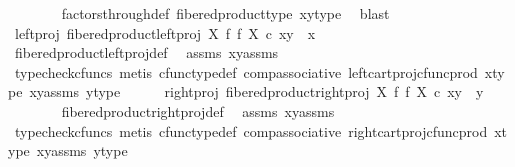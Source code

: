 \begin{isabellebody}
\ \ \ \ \ \ \isamarkupfalse%
\ factors{\isacharunderscore}{\kern0pt}through{\isacharunderscore}{\kern0pt}def{}\ fibered{\isacharunderscore}{\kern0pt}product{\isacharunderscore}{\kern0pt}type\ x{\isacharunderscore}{\kern0pt}y{\isacharunderscore}{\kern0pt}type\ \isamarkupfalse%
\ blast\isanewline
\isanewline
\ \ \ \ \isamarkupfalse%
\ left{\isacharunderscore}{\kern0pt}proj{\isacharcolon}{\kern0pt}\ {\isachardoublequoteopen}fibered{\isacharunderscore}{\kern0pt}product{\isacharunderscore}{\kern0pt}left{\isacharunderscore}{\kern0pt}proj\ X\ f\ f\ X\ {\isasymcirc}\isactrlsub c\ xy\ {\isacharequal}{\kern0pt}\ x{\isachardoublequoteclose}\isanewline
\ \ \ \ \ \ \isamarkupfalse%
\ fibered{\isacharunderscore}{\kern0pt}product{\isacharunderscore}{\kern0pt}left{\isacharunderscore}{\kern0pt}proj{\isacharunderscore}{\kern0pt}def\ \isamarkupfalse%
\ assms\ xy{\isacharunderscore}{\kern0pt}assms\isanewline
\ \ \ \ \ \ \isamarkupfalse%
\ {\isacharparenleft}{\kern0pt}typecheck{\isacharunderscore}{\kern0pt}cfuncs{\isacharcomma}{\kern0pt}\ metis\ cfunc{\isacharunderscore}{\kern0pt}type{\isacharunderscore}{\kern0pt}def\ comp{\isacharunderscore}{\kern0pt}associative\ left{\isacharunderscore}{\kern0pt}cart{\isacharunderscore}{\kern0pt}proj{\isacharunderscore}{\kern0pt}cfunc{\isacharunderscore}{\kern0pt}prod\ x{\isacharunderscore}{\kern0pt}type{}\ xy{\isacharunderscore}{\kern0pt}assms{\isacharparenleft}{\kern0pt}{}{\isacharparenright}{\kern0pt}\ y{\isacharunderscore}{\kern0pt}type{}{\isacharparenright}{\kern0pt}\isanewline
\ \ \ \ \isamarkupfalse%
\ right{\isacharunderscore}{\kern0pt}proj{\isacharcolon}{\kern0pt}\ {\isachardoublequoteopen}fibered{\isacharunderscore}{\kern0pt}product{\isacharunderscore}{\kern0pt}right{\isacharunderscore}{\kern0pt}proj\ X\ f\ f\ X\ {\isasymcirc}\isactrlsub c\ xy\ {\isacharequal}{\kern0pt}\ y{\isachardoublequoteclose}\isanewline
\ \ \ \ \ \ \isamarkupfalse%
\ fibered{\isacharunderscore}{\kern0pt}product{\isacharunderscore}{\kern0pt}right{\isacharunderscore}{\kern0pt}proj{\isacharunderscore}{\kern0pt}def\ \isamarkupfalse%
\ assms\ xy{\isacharunderscore}{\kern0pt}assms\isanewline
\ \ \ \ \ \ \isamarkupfalse%
\ {\isacharparenleft}{\kern0pt}typecheck{\isacharunderscore}{\kern0pt}cfuncs{\isacharcomma}{\kern0pt}\ metis\ cfunc{\isacharunderscore}{\kern0pt}type{\isacharunderscore}{\kern0pt}def\ comp{\isacharunderscore}{\kern0pt}associative\ right{\isacharunderscore}{\kern0pt}cart{\isacharunderscore}{\kern0pt}proj{\isacharunderscore}{\kern0pt}cfunc{\isacharunderscore}{\kern0pt}prod\ x{\isacharunderscore}{\kern0pt}type{}\ xy{\isacharunderscore}{\kern0pt}assms{\isacharparenleft}{\kern0pt}{}{\isacharparenright}{\kern0pt}\ y{\isacharunderscore}{\kern0pt}type{}{\isacharparenright}{\kern0pt}\isanewline

\end{isabellebody}
